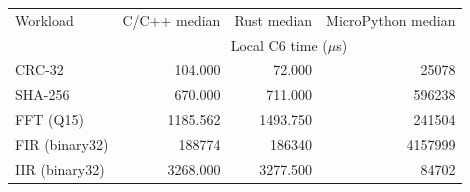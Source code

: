\begin{tabular}{@{}lrrr@{}}
\toprule
Workload & C/C++ median & Rust median & MicroPython median \\
 & \multicolumn{3}{c}{Local C6 time (\(\mu\)s)} \\
\midrule
CRC-32 & 104.000 & 72.000 & 25078 \\
SHA-256 & 670.000 & 711.000 & 596238 \\
FFT (Q15) & 1185.562 & 1493.750 & 241504 \\
FIR (binary32) & 188774 & 186340 & 4157999 \\
IIR (binary32) & 3268.000 & 3277.500 & 84702 \\
\bottomrule
\end{tabular}
